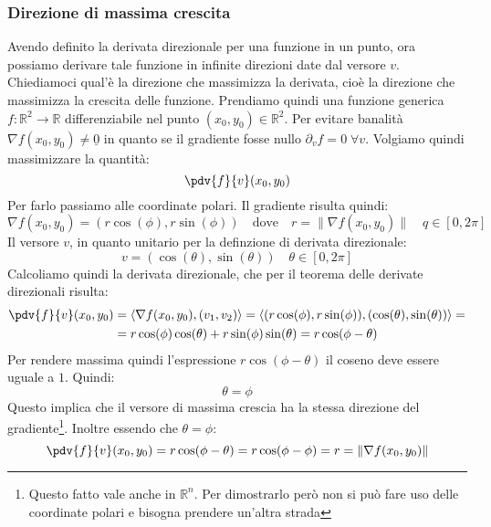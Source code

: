 \subsubsection{Direzione di massima crescita}
Avendo definito la derivata direzionale per una funzione in un punto, ora 
possiamo derivare tale funzione in infinite direzioni date dal versore $v$. 
Chiediamoci qual'è la direzione che massimizza la derivata, cioè la direzione 
che massimizza la crescita delle funzione. Prendiamo quindi una funzione 
generica $f: \mathbb{R}^2 \to \mathbb{R}$ differenziabile nel punto $(x_0, y_0) 
\in \mathbb{R}^2$. Per evitare banalità $\nabla f(x_0, y_0) \neq \underline{0}$ 
in quanto se il gradiente fosse nullo $\partial_v f = 0 \; \forall v$. Volgiamo 
quindi massimizzare la quantità:
\begin{equation*}
	\pdv{f}{v}(x_0, y_0)
\end{equation*}
Per farlo passiamo alle coordinate polari. Il gradiente risulta quindi:
\begin{equation*}
	\nabla f(x_0, y_0) = (r\cos(\phi), r\sin(\phi)) \quad \text{dove} 
	\quad r = \lVert \nabla f(x_0, y_0) \rVert \quad q \in [0, 2\pi]
\end{equation*}
Il versore $v$, in quanto unitario per la definzione di derivata direzionale:
\begin{equation*}
	v = (\cos(\theta), \sin(\theta)) \quad \theta \in [0, 2\pi]
\end{equation*}
Calcoliamo quindi la derivata direzionale, che per il teorema delle derivate 
direzionali risulta:
\begin{align*}
	\pdv{f}{v}(x_0, y_0) &= \langle \nabla f(x_0, y_0), (v_1, v_2) \rangle 
	= \langle (r\cos(\phi), r\sin(\phi)), (\cos(\theta), \sin(\theta)) 
	\rangle =\\
	&= r\cos(\phi)\cos(\theta) + r\sin(\phi)\sin(\theta) = r \cos(\phi - 
	\theta)
\end{align*}
Per rendere massima quindi l'espressione $r \cos(\phi - \theta)$ il coseno deve 
essere uguale a $1$. Quindi:
\begin{equation*}
	\theta = \phi
\end{equation*}
Questo implica che il versore di massima crescia ha la stessa direzione del 
gradiente\footnote{Questo fatto vale anche in $\mathbb{R}^n$. Per dimostrarlo 
però non si può fare uso delle coordinate polari e bisogna prendere un'altra 
strada}. Inoltre essendo che $\theta = \phi$:
\begin{equation*}
	\pdv{f}{v}(x_0, y_0) = r\cos(\phi - \theta) = r\cos(\phi - \phi) = r = 
	\lVert \nabla f(x_0, y_0) \rVert
\end{equation*}
